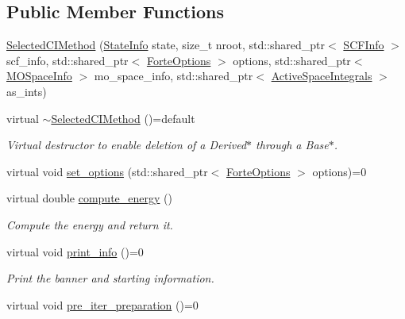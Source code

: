 \subsection*{Public Member Functions}
\begin{DoxyCompactItemize}
\item 
\mbox{\hyperlink{classforte_1_1_selected_c_i_method_a3062204ea433444c4a8f5c0cfcfb5779}{Selected\+C\+I\+Method}} (\mbox{\hyperlink{classforte_1_1_state_info}{State\+Info}} state, size\+\_\+t nroot, std\+::shared\+\_\+ptr$<$ \mbox{\hyperlink{classforte_1_1_s_c_f_info}{S\+C\+F\+Info}} $>$ scf\+\_\+info, std\+::shared\+\_\+ptr$<$ \mbox{\hyperlink{classforte_1_1_forte_options}{Forte\+Options}} $>$ options, std\+::shared\+\_\+ptr$<$ \mbox{\hyperlink{classforte_1_1_m_o_space_info}{M\+O\+Space\+Info}} $>$ mo\+\_\+space\+\_\+info, std\+::shared\+\_\+ptr$<$ \mbox{\hyperlink{classforte_1_1_active_space_integrals}{Active\+Space\+Integrals}} $>$ as\+\_\+ints)
\item 
virtual \mbox{\hyperlink{classforte_1_1_selected_c_i_method_a1d6e4dad94655f4ad91e32d4afaf19a7}{$\sim$\+Selected\+C\+I\+Method}} ()=default
\begin{DoxyCompactList}\small\item\em Virtual destructor to enable deletion of a Derived$\ast$ through a Base$\ast$. \end{DoxyCompactList}\item 
virtual void \mbox{\hyperlink{classforte_1_1_selected_c_i_method_ad03bbde3a0443ca9b01ff9605f2e06e0}{set\+\_\+options}} (std\+::shared\+\_\+ptr$<$ \mbox{\hyperlink{classforte_1_1_forte_options}{Forte\+Options}} $>$ options)=0
\item 
virtual double \mbox{\hyperlink{classforte_1_1_selected_c_i_method_ada6462543804bed5d15d699ed06e182e}{compute\+\_\+energy}} ()
\begin{DoxyCompactList}\small\item\em Compute the energy and return it. \end{DoxyCompactList}\item 
virtual void \mbox{\hyperlink{classforte_1_1_selected_c_i_method_a95680d60059b29c763b5f87f9add48e2}{print\+\_\+info}} ()=0
\begin{DoxyCompactList}\small\item\em Print the banner and starting information. \end{DoxyCompactList}\item 
virtual void \mbox{\hyperlink{classforte_1_1_selected_c_i_method_af92b210415034874fcf2faac8b00eca9}{pre\+\_\+iter\+\_\+preparation}} ()=0

\end{DoxyCompactItemize}
